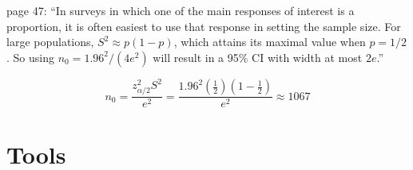 \documentclass{article}
\theoremstyle{definition}
\begin{document}
\begin{flushleft}
\cite{lohr2019} page 47:
``In surveys in which one of the main responses of interest
is a proportion, it is often easiest to use that response
in setting the sample size.
For large populations, $S^2 \approx p(1-p)$, which
attains its maximal value when $p=1/2$. So using
$n_0=1.96^2/(4e^2)$ will result in a 95\% CI with width at most
$2e$.''

$$
	n_0
	=
	\frac{
		z^2_{\alpha/2}S^2
	}{
		e^2
	}
	=
	\frac{
		1.96^2(\frac{1}{2})(1-\frac{1}{2})
	}{
		e^2
	}
	\approx
	1067
$$

\section{Tools} \label{sec:tools}


\end{flushleft}
\printbibliography
\end{document}
